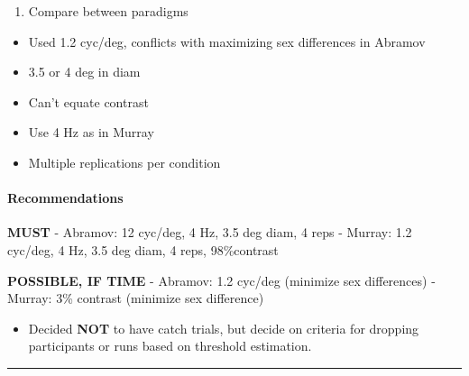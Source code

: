 \documentclass[]{article}
\providecommand{\tightlist}{%
  \setlength{\itemsep}{0pt}\setlength{\parskip}{0pt}}
\let\oldparagraph\paragraph
\renewcommand{\paragraph}[1]{\oldparagraph{#1}\mbox{}}
\begin{document}
\begin{enumerate}
\def\labelenumi{\arabic{enumi}.}
\setcounter{enumi}{2}
\tightlist
\item
  Compare between paradigms
\end{enumerate}

\begin{itemize}
\tightlist
\item
  Used 1.2 cyc/deg, conflicts with maximizing sex differences in Abramov
\item
  3.5 or 4 deg in diam
\item
  Can't equate contrast
\item
  Use 4 Hz as in Murray
\item
  Multiple replications per condition
\end{itemize}

\paragraph{Recommendations}\label{recommendations}

\textbf{MUST} - Abramov: 12 cyc/deg, 4 Hz, 3.5 deg diam, 4 reps -
Murray: 1.2 cyc/deg, 4 Hz, 3.5 deg diam, 4 reps, 98\%contrast

\textbf{POSSIBLE, IF TIME} - Abramov: 1.2 cyc/deg (minimize sex
differences) - Murray: 3\% contrast (minimize sex difference)

\begin{itemize}
\tightlist
\item
  Decided \textbf{NOT} to have catch trials, but decide on criteria for
  dropping participants or runs based on threshold estimation.
\end{itemize}

\begin{center}\rule{0.5\linewidth}{\linethickness}\end{center}
\end{document}
